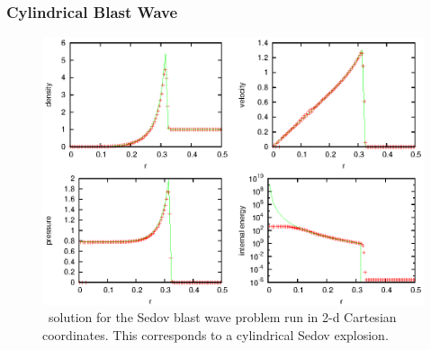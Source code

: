 \subsubsection{Cylindrical Blast Wave}

\begin{figure}[h]
\centering
\includegraphics[width=5.0in]{sedov_cyl}
\caption{\label{fig:sedov_cyl} \castro\ solution for the Sedov blast wave problem
  run in 2-d Cartesian coordinates.  This corresponds to a cylindrical
  Sedov explosion.}
\end{figure}

